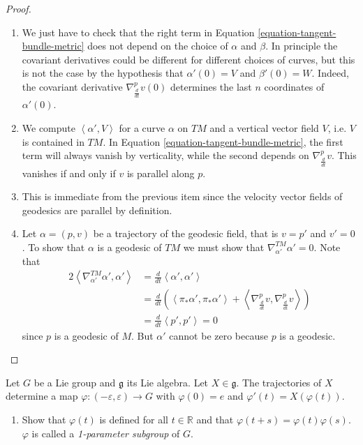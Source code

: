 \documentclass{book}
\begin{document}
\begin{proof}
\begin{enumerate}
\item We just have to check that the right
term in
Equation \ref{equation-tangent-bundle-metric}
does not depend on the choice of $\alpha$ and
$\beta$.
In principle the covariant derivatives could
be different
for different choices of curves, but this is
not the
case by the hypothesis that $\alpha'(0)=V$
and $\beta'(0)=W$.
Indeed, the covariant derivative
$\nabla_{\frac{d}{dt}}^pv(0)$
determines the last $n$ coordinates of
$\alpha'(0)$.

\item We compute $\left\langle{}\alpha',V\right\rangle{}$ for
a curve $\alpha$ on $TM$
and a vertical vector field $V$, i.e. $V$ is
contained in $TM$.
In Equation
\ref{equation-tangent-bundle-metric},
the first term will always vanish by
verticality,
while the second depends on
$\nabla_{\frac{d}{dt}}^pv$.
This vanishes if and only if $v$ is parallel
along $p$.

\item This is immediate from the previous
item
since the velocity vector fields of geodesics
are parallel by definition.

\item Let $\alpha=(p,v)$ be a trajectory of
the geodesic field,
that is $v=p'$ and $v'=0$.
To show that $\alpha$ is a geodesic of $TM$
we must show that
$\nabla_{\alpha'}^{TM}\alpha'=0$.
Note that
$$
\begin{aligned}
2\left\langle{}\nabla_{\alpha'}^{TM}\alpha',
\alpha'\right\rangle{}
&=\frac{d}{dt}\left\langle{}\alpha',\alpha'\right\rangle{}\\
&=\frac{d}{dt}\left(\left\langle{}\pi_*\alpha',
\pi_*\alpha'\right\rangle{}
+\left\langle{}\nabla_{\frac{d}{dt}}^pv,
\nabla_{\frac{d}{dt}}^pv\right\rangle{}\right)\\
&=\frac{d}{dt}\left\langle{}p',p'\right\rangle{}=0
\end{aligned}
$$
since $p$ is a geodesic of $M$.
But $\alpha'$ cannot be zero because $p$ is a
geodesic.
\end{enumerate}
\end{proof}

\begin{exercise}
\label{exercise-lie-group-bi-invar-metri}
Let $G$ be a Lie group and $\mathfrak{g}$ its
Lie algebra.
Let $X \in \mathfrak{g}$. The trajectories of
$X$
determine a map
$\varphi:(-\varepsilon,\varepsilon) \to G$
with $\varphi(0)=e$ and
$\varphi'(t)=X(\varphi(t))$.

\begin{enumerate}
\item Show that $\varphi(t)$ is defined for
all $t \in \mathbb{R}$
and that $\varphi(t+s)=\varphi(t)\varphi(s)$.
$\varphi$ is called a {\it 1-parameter
subgroup} of $G$.
\end{enumerate}
\end{exercise}
\end{document}
